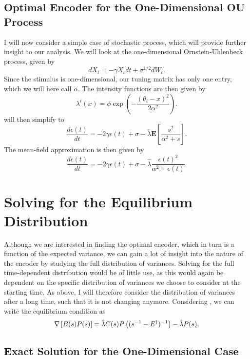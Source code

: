 \subsection{Optimal Encoder for the One-Dimensional OU Process}
I will now consider a simple case of stochastic process, which will provide further insight to our analysis. We will look at the one-dimensional Ornstein-Uhlenbeck process, given by
\[
dX_t = -\gamma X_t dt + \sigma^{1/2} dW_t.
\]
Since the stimulus is one-dimensional, our tuning matrix has only one entry, which we will here call $\alpha$. The intensity functions are then given by
\[
\lambda ^i(x) = \phi \exp\left(-\frac{(\theta_i-x)^2}{2\alpha^2}\right).
\]
 will then simplify to
\begin{equation}
\label{eq:epsilon_1d_exact}
\frac{d\epsilon(t)}{dt} = -2\gamma \epsilon(t) + \sigma -\hat{\lambda} \boldsymbol{E}\left[\frac{s^2}{\alpha^2+s}\right].
\end{equation}
The mean-field approximation is then given by
\begin{equation}
\label{eq:epsilon_1d_mf}
\frac{d\epsilon(t)}{dt} = -2\gamma \epsilon(t) + \sigma -\hat{\lambda} \frac{\epsilon(t)^2}{\alpha^2+\epsilon(t)}.
\end{equation}

\section{Solving for the Equilibrium Distribution}
Although we are interested in finding the optimal encoder, which in turn is a function of the expected variance, we can gain a lot of insight into the nature of the encoder by studying the full distribution of variances. Solving for the full time-dependent distribution would be of little use, as this would again be dependent on the specific distribution of variances we choose to consider at the starting time. As above, I will therefore consider the distribution of variances after a long time, such that it is not changing anymore. Considering , we can write the equilibrium condition as
\begin{equation}
\label{eq:equilibrium_DCKE_sigma}
\nabla \left[B(s) P(s)\right] = \hat{\lambda} C(s) P\left( (s^{-1} - \covar^\dagger)^{-1}\right) -\hat{\lambda} P(s),
\end{equation}

\subsection{Exact Solution for the One-Dimensional Case}

